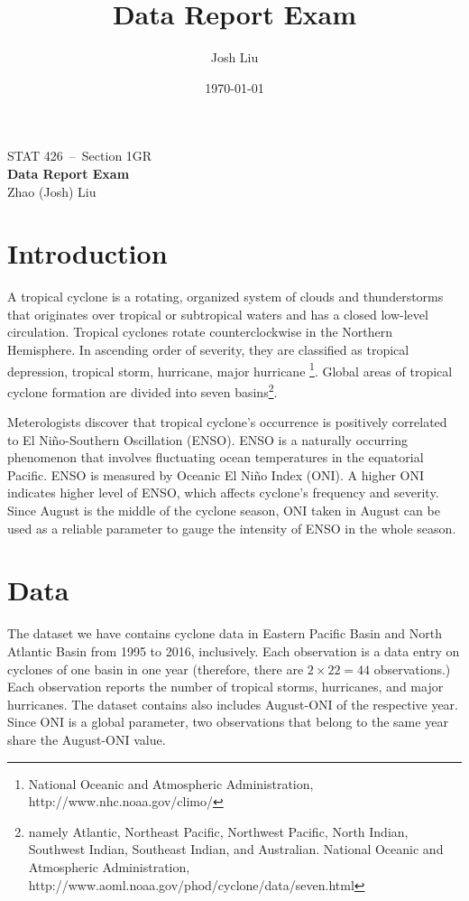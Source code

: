 \documentclass[12pt,a4paper]{article}
\author{Josh Liu}
\title{Data Report Exam}
\date{\today}
\begin{document}
	\begin{center}
		STAT 426\ --\ Section 1GR\\
		\textbf{Data Report Exam}\\
		Zhao (Josh) Liu
	\end{center}

\section{Introduction}

A tropical cyclone is a rotating, organized system of clouds and thunderstorms that originates over tropical or subtropical waters and has a closed low-level circulation. Tropical cyclones rotate counterclockwise in the Northern Hemisphere. In ascending order of severity, they are classified as tropical depression, tropical storm, hurricane, major hurricane \footnote{National Oceanic and Atmospheric Administration, http://www.nhc.noaa.gov/climo/}. Global areas of tropical cyclone formation are divided into seven basins\footnote{namely Atlantic, Northeast Pacific, Northwest Pacific, North Indian, Southwest Indian, Southeast Indian, and Australian. National Oceanic and Atmospheric Administration, http://www.aoml.noaa.gov/phod/cyclone/data/seven.html }. 

Meterologists discover that tropical cyclone's occurrence is positively correlated to El Ni\~{n}o-Southern Oscillation (ENSO). ENSO is a naturally occurring phenomenon that involves fluctuating ocean temperatures in the equatorial Pacific. ENSO is measured by Oceanic El Ni\~{n}o Index (ONI). A higher ONI indicates higher level of ENSO, which affects cyclone's frequency and severity. Since August is the middle of the cyclone season, ONI taken in August can be used as a reliable  parameter to gauge the intensity of ENSO in the whole season.

\section{Data}
The dataset we have contains cyclone data in Eastern Pacific Basin and North Atlantic Basin from 1995 to 2016, inclusively. Each observation is a data entry on cyclones of one basin in one year (therefore, there are $2 \times 22 = 44$ observations.) Each observation reports the number of tropical storms, hurricanes, and major hurricanes. The dataset contains also includes August-ONI of the respective year. Since ONI is a global parameter, two observations that belong to the same year share the August-ONI value.
\end{document}
